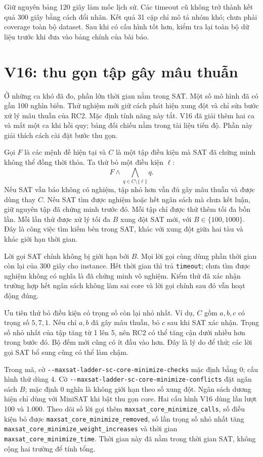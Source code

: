 \documentclass[11pt,a4paper]{article}
\newcommand{\code}[1]{\texttt{#1}}
\newcommand{\file}[1]{\nolinkurl{#1}}
\begin{document}
Giữ nguyên bảng 120 giây làm mốc lịch sử. Các timeout cũ không trở thành
kết quả 300 giây bằng cách đổi nhãn. Kết quả 31 cặp chỉ mô tả nhóm khó;
chưa phải coverage toàn bộ dataset. Sau khi có cấu hình tốt hơn, kiểm tra
lại toàn bộ dữ liệu trước khi đưa vào bảng chính của bài báo.

\section{V16: thu gọn tập gây mâu thuẫn}

Ở những ca khó đã đo, phần lớn thời gian nằm trong SAT. Một số mô hình
đã có gần 100 nghìn biến. Thử nghiệm mới giữ cách phát hiện xung đột và
chỉ sửa bước xử lý mâu thuẫn của RC2. Mặc định tính năng này tắt. V16 đã
giải thêm hai ca và mất một ca khi hồi quy; bảng đối chiếu nằm trong tài
liệu tiến độ. Phần này giải thích cách cài đặt bước thu gọn.

Gọi $F$ là các mệnh đề hiện tại và $C$ là một tập điều kiện mà SAT đã
chứng minh không thể đồng thời thỏa. Ta thử bỏ một điều kiện $\ell$:
\[
 F\land\bigwedge_{q\in C\setminus\{\ell\}}q.
\]
Nếu SAT vẫn báo không có nghiệm, tập nhỏ hơn vẫn đủ gây mâu thuẫn và
được dùng thay $C$. Nếu SAT tìm được nghiệm hoặc hết ngân sách mà chưa
kết luận, giữ nguyên tập đã chứng minh trước đó. Mỗi tập chỉ được thử thêm
tối đa bốn lần. Mỗi lần thử được xử lý tối đa $B$ xung đột SAT mới, với
$B\in\{100,1000\}$. Đây là công việc tìm kiếm bên trong SAT, khác với
xung đột giữa hai tàu và khác giới hạn thời gian.

Lời gọi SAT chính không bị giới hạn bởi $B$. Mọi lời gọi cùng dùng phần
thời gian còn lại của 300 giây cho instance. Hết thời gian thì trả
\code{timeout}; chưa tìm được nghiệm không có nghĩa là đã chứng minh vô
nghiệm. Kiểm thử đã xác nhận trường hợp hết ngân sách không làm sai core
và lời gọi chính sau đó vẫn hoạt động đúng.

Ưu tiên thử bỏ điều kiện có trọng số còn lại nhỏ nhất. Ví dụ, $C$ gồm
$a,b,c$ có trọng số $5,7,1$. Nếu chỉ $a,b$ đã gây mâu thuẫn, bỏ $c$ sau
khi SAT xác nhận. Trọng số nhỏ nhất của tập tăng từ 1 lên 5, nên RC2 có
thể tăng cận dưới nhiều hơn trong bước đó. Bộ đếm mới cũng có ít đầu vào
hơn. Đây là lý do để thử; các lời gọi SAT bổ sung cũng có thể làm chậm.

Trong mã, cờ \file{--maxsat-ladder-sc-core-minimize-checks} mặc định bằng
0; cấu hình thử dùng 4. Cờ
\file{--maxsat-ladder-sc-core-minimize-conflicts} đặt ngân sách $B$;
mặc định 0 nghĩa là không giới hạn theo số xung đột. Ngân sách dương hiện
chỉ dùng với MiniSAT khi bật thu gọn core. Hai cấu hình V16 dùng lần lượt
100 và 1.000. Theo dõi số lời gọi thêm
\code{maxsat\_core\_minimize\_calls}, số điều kiện bỏ được
\code{maxsat\_core\_minimize\_removed}, số lần trọng số nhỏ nhất tăng
\code{maxsat\_core\_minimize\_weight\_increases} và thời gian
\code{maxsat\_core\_minimize\_time}. Thời gian này đã nằm trong thời gian
SAT, không cộng hai trường để tính tổng.
\end{document}
